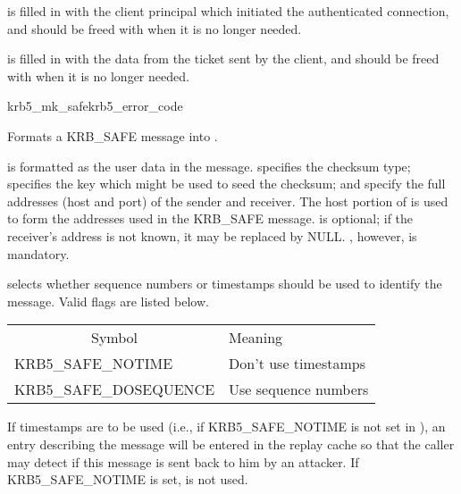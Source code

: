  is filled in with the client principal which
initiated the authenticated connection, and should be freed with
 when it is no longer needed.

 is filled in with the data from the ticket sent by
the client, and should be freed with  when
it is no longer needed.

\begin{funcdecl}{krb5_mk_safe}{krb5_error_code}{\funcin}
\funcout
{}
\end{funcdecl}

Formats a KRB_SAFE message into .

 is formatted as the user data in the message.
 specifies the checksum type; 
specifies the key which might be used to seed the checksum;
 and  specify the full
addresses (host and port) of the sender and receiver.  The host
portion of  is used to form the addresses used
in the KRB_SAFE message.   is optional; if the
receiver's address is not known, it may be replaced by NULL.
, however, is mandatory.

 selects whether sequence numbers or timestamps
should be used to identify the message.  Valid flags are listed below.

\begin{tabular}{ll}
\multicolumn{1}{c}{Symbol} & Meaning \\
KRB5_SAFE_NOTIME		& Don't use timestamps \\
KRB5_SAFE_DOSEQUENCE	& Use sequence numbers \\
\end{tabular}

If timestamps are to be used (i.e., if KRB5_SAFE_NOTIME is not set in
), an entry
describing the message will be entered in the replay cache
 so that the caller may detect if this message is sent
back to him by an attacker.  If KRB5_SAFE_NOTIME is set,
 is not used.

